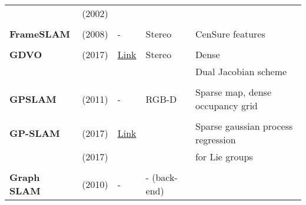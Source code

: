 \documentclass[a4paper,12pt]{scrartcl}
\begin{document}
{\begin{longtable}{l|l|l|l|l}
                           & \cite{Montemerlo2002} (2002)      &                                                                    &                       &\\
                           &                                   &                                                                    &                       &\\
    \textbf{FrameSLAM}     & \cite{Konolige2008} (2008)        & -                                                                  & Stereo                & CenSure features\\
                           &                                   &                                                                    &                       &\\
    \textbf{GDVO}          & \cite{Zhu2017} (2017)             & {\href{https://github.com/syywh/gdvo}{Link}}                       & Stereo                & Dense\\
                           &                                   &                                                                    &                       & Dual Jacobian scheme\\
                           &                                   &                                                                    &                       &\\
    \textbf{GPSLAM}        & \cite{Pirker2011a} (2011)         & -                                                                  & RGB-D                 & Sparse map, dense occupancy grid\\
                           &                                   &                                                                    &                       &\\
    \textbf{GP-SLAM}       & \cite{Yan2017} (2017)             & {\href{https://github.com/gtrll/gpslam}{Link}}                     &                       & Sparse gaussian process regression\\
                           & \cite{Dong2017} (2017)            &                                                                    &                       & for Lie groups\\
                           &                                   &                                                                    &                       &\\
    \textbf{Graph SLAM}    & \cite{Grisetti2010} (2010)        & -                                                                  & - (back-end)          &\\

\end{longtable}}
\end{document}
